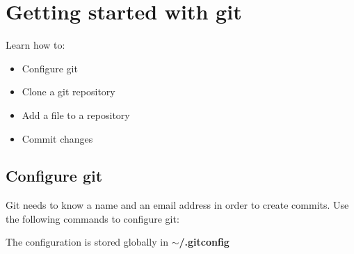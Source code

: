 \section{Getting started with git}
\begin{frame}[fragile]
  \slidetitle

  Learn how to:
  \begin{itemize}
    \item Configure git
    \item Clone a git repository
    \item Add a file to a repository
    \item Commit changes
  \end{itemize}
\end{frame}

\subsection{Configure git}
\begin{frame}[fragile]
  \subslidetitle
  Git needs to know a name and an email address in order to create commits.
  \vspace{1em}
  Use the following commands to configure git:
  \begin{itemize}
  \end{itemize}

  The configuration is stored globally in \bf{$\sim$/.gitconfig}
\end{frame}


